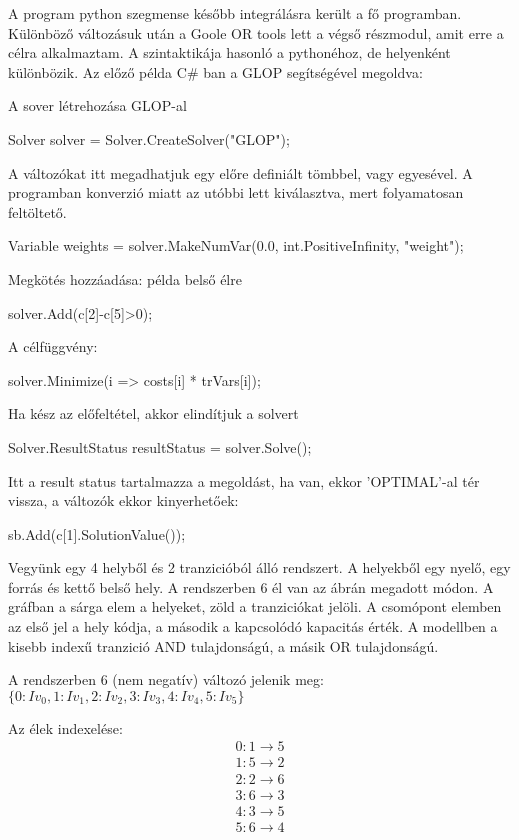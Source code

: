 A program python szegmense később integrálásra került a fő programban. Különböző változásuk után a Goole OR tools lett a végső részmodul, amit erre a célra alkalmaztam. A szintaktikája hasonló a pythonéhoz, de helyenként különbözik. Az előző példa C\# ban a GLOP segítségével megoldva:

A sover létrehozása GLOP-al
\begin{cpp}
Solver solver = Solver.CreateSolver("GLOP");
\end{cpp}
A változókat itt megadhatjuk egy előre definiált tömbbel, vagy egyesével. A programban konverzió miatt az utóbbi lett kiválasztva, mert folyamatosan feltöltető.
\begin{cpp}
Variable weights = solver.MakeNumVar(0.0, int.PositiveInfinity, "weight");
\end{cpp}
Megkötés hozzáadása: példa belső élre
\begin{cpp}
solver.Add(c[2]-c[5]>0);
\end{cpp}
A célfüggvény:
\begin{cpp}
solver.Minimize(i => costs[i] * trVars[i]);
\end{cpp}
Ha kész az előfeltétel, akkor elindítjuk a solvert
\begin{cpp}
Solver.ResultStatus resultStatus = solver.Solve();
\end{cpp}
Itt a result status tartalmazza a megoldást, ha van, ekkor 'OPTIMAL'-al tér vissza, a változók ekkor kinyerhetőek:
\begin{cpp}
sb.Add(c[1].SolutionValue());
\end{cpp}

Vegyünk egy 4 helyből és 2 tranzicióból álló rendszert. A helyekből egy nyelő, egy forrás és kettő belső hely. A rendszerben 6 él van az ábrán megadott módon.  A gráfban a sárga elem a helyeket, zöld a tranziciókat jelöli. A csomópont elemben az első jel a hely kódja, a második a kapcsolódó kapacitás érték. A modellben a kisebb indexű tranzició AND tulajdonságú, a másik OR tulajdonságú. 

A rendszerben 6 (nem negatív) változó jelenik meg:  $\{0: Iv_0, 1: Iv_1, 2: Iv_2, 3: Iv_3, 4: Iv_4, 5: Iv_5\}$

Az élek indexelése:
\begin{align*}
0  :  1 \rightarrow 5  \\
1  :  5 \rightarrow 2  \\
2  :  2 \rightarrow 6  \\
3  :  6 \rightarrow 3  \\
4  :  3 \rightarrow 5  \\
5  :  6 \rightarrow 4 
\end{align*}

